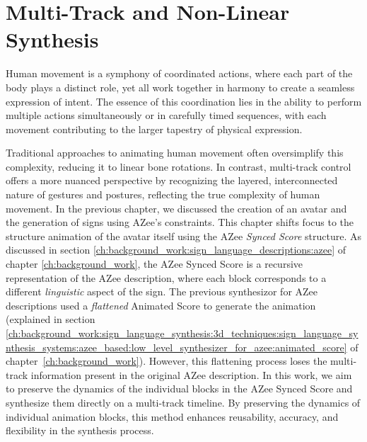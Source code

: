\documentclass[../../main.tex]{subfiles}
\begin{document}
\chapter{Multi-Track and Non-Linear Synthesis}
\label{ch:multi_track}

Human movement is a symphony of coordinated actions, where each part of the body plays a distinct role, yet all work together in harmony to create a seamless expression of intent. The essence of this coordination lies in the ability to perform multiple actions simultaneously or in carefully timed sequences, with each movement contributing to the larger tapestry of physical expression.

Traditional approaches to animating human movement often oversimplify this complexity, reducing it to linear bone rotations. In contrast, multi-track control offers a more nuanced perspective by recognizing the layered, interconnected nature of gestures and postures, reflecting the true complexity of human movement. In the previous chapter, we discussed the creation of an avatar and the generation of signs using AZee's constraints. This chapter shifts focus to the structure animation of the avatar itself using the AZee \emph{Synced Score} structure. As discussed in section \ref{ch:background_work:sign_language_descriptions:azee} of chapter \ref{ch:background_work}, the AZee Synced Score is a recursive representation of the AZee description, where each block corresponds to a different \emph{linguistic} aspect of the sign. The previous synthesizor for AZee descriptions used a \emph{flattened} Animated Score to generate the animation (explained in section \ref{ch:background_work:sign_language_synthesis:3d_techniques:sign_language_synthesis_systems:azee_based:low_level_synthesizer_for_azee:animated_score} of chapter~\ref{ch:background_work}). However, this flattening process loses the multi-track information present in the original AZee description. In this work, we aim to preserve the dynamics of the individual blocks in the AZee Synced Score and synthesize them directly on a multi-track timeline. By preserving the dynamics of individual animation blocks, this method enhances reusability, accuracy, and flexibility in the synthesis process.
\end{document}
